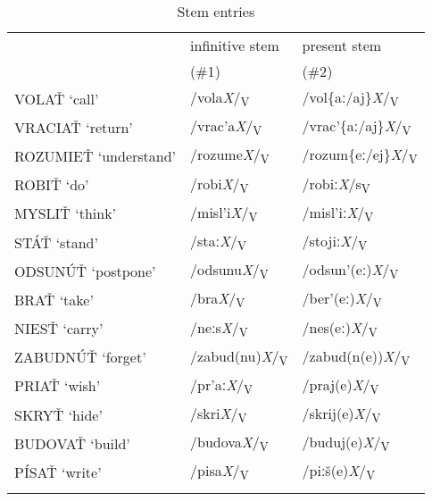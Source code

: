 \documentclass[output=paper,colorlinks,citecolor=brown,
]{langscibook}
\begin{document}
\begin{table}
\caption{Stem entries}
\label{tab:pitsch:6}
\begin{tabular}{lll}
\lsptoprule
        & infinitive stem   & present stem \\
        & (\textsc{\#1}) & (\textsc{\#2}) \\
\midrule
  VOLAŤ `call' & /vola\textit{X}/\textsubscript{V} & /vol\{aː/aj\}\textit{X}/\textsubscript{V} \\
  VRACIAŤ `return' & /vrac'a\textit{X}/\textsubscript{V} & /vrac'\{aː/aj\}\textit{X}/\textsubscript{V} \\
  ROZUMIEŤ `understand' & /rozume\textit{X}/\textsubscript{V} & 
  /rozum\{eː/ej\}\textit{X}/\textsubscript{V} \\
\midrule
  ROBIŤ `do' & /robi\textit{X}/\textsubscript{V} & /robiː\textit{X}/s\textsubscript{V} \\
  MYSLIŤ `think' & /misl'i\textit{X}/\textsubscript{V} & /misl'iː\textit{X}/\textsubscript{V} \\
  STÁŤ `stand' & /staː\textit{X}/\textsubscript{V} & /stojiː\textit{X}/\textsubscript{V} \\
\midrule
  ODSUNÚŤ `postpone' & /odsunu\textit{X}/\textsubscript{V} & /odsun'(eː)\textit{X}/\textsubscript{V} \\
  BRAŤ `take' & /bra\textit{X}/\textsubscript{V} & /ber'(eː)\textit{X}/\textsubscript{V} \\
  NIESŤ `carry' & /neːs\textit{X}/\textsubscript{V} & /nes(eː)\textit{X}/\textsubscript{V} \\
\midrule
  ZABUDNÚŤ `forget' & /zabud(nu)\textit{X}/\textsubscript{V} & /zabud(n(e))\textit{X}/\textsubscript{V} \\
  PRIAŤ `wish' & /pr'aː\textit{X}/\textsubscript{V} & /praj(e)\textit{X}/\textsubscript{V} \\
  SKRYŤ `hide' & /skri\textit{X}/\textsubscript{V} & /skrij(e)\textit{X}/\textsubscript{V} \\
  BUDOVAŤ `build' & /budova\textit{X}/\textsubscript{V} & /buduj(e)\textit{X}/\textsubscript{V} \\
  PÍSAŤ `write' & /pisa\textit{X}/\textsubscript{V} & /piːš(e)\textit{X}/\textsubscript{V} \\
\lspbottomrule
\end{tabular}
\end{table}
\end{document}
